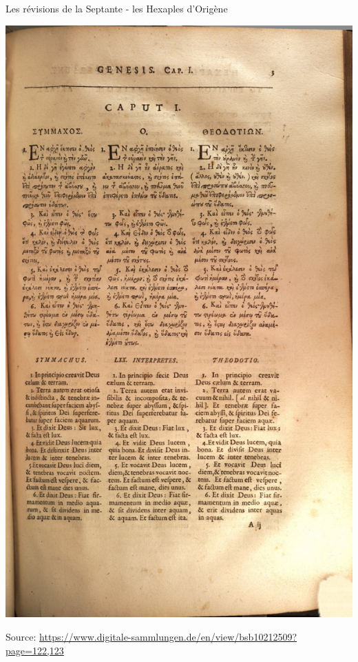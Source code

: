 \documentclass[11pt]{beamer}
\begin{document}
\begin{frame}{Les révisions de la Septante - les Hexaples d'Origène}
\begin{minipage}{0.48\textwidth}
    \includegraphics[width=\textwidth]{img/origen_right.jpg}
\end{minipage}
\tiny{Source: \href{https://www.digitale-sammlungen.de/en/view/bsb10212509?page=122,123}{https://www.digitale-sammlungen.de/en/view/bsb10212509?page=122,123}}
\end{frame}
\end{document}
